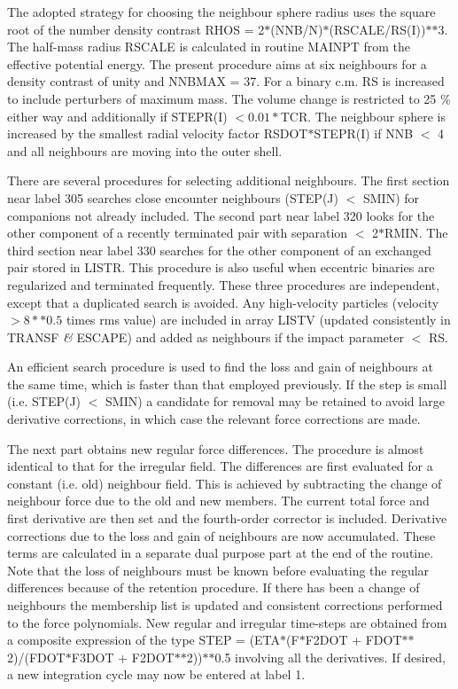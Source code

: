   The adopted strategy for choosing the neighbour sphere radius uses
 the square root of the number density contrast 
 RHOS = 2$\ast$(NNB/N)$\ast$(RSCALE/RS(I))$\ast$$\ast$3.  The half-mass radius 
 RSCALE is calculated in routine MAINPT from the effective potential
 energy.  The present procedure aims
 at six neighbours for a density contrast of unity and NNBMAX = 37.  For a
 binary c.m. RS is increased to include perturbers of 
 maximum mass.  The volume change is restricted to 25 \% either way and additionally
 if STEPR(I) $< 0.01\ast$TCR.  The neighbour
 sphere is increased by the smallest radial velocity factor
 RSDOT$\ast$STEPR(I) if NNB $<$ 4 and all neighbours are moving into the outer shell.

 There are several procedures for selecting additional neighbours.  The first
 section near label 305 searches close encounter neighbours (STEP(J) $<$ SMIN)
 for companions not already included.  The second part near label 320 looks for
 the other component of a recently terminated pair with separation $<$
 2$\ast$RMIN.  The third section near label 330 searches for the other
 component of an exchanged pair stored in LISTR.  This procedure is also
 useful when eccentric binaries are regularized and terminated
 frequently.  These three procedures are independent, except that 
 a duplicated search is
 avoided.  Any high-velocity particles (velocity $> 8\ast \ast 0.5$ times rms value) are   
 included in array LISTV (updated consistently in TRANSF {\it\&} ESCAPE)
 and added as neighbours if the impact parameter $<$ RS.

  An efficient search procedure is used to find the loss and gain of
 neighbours at the same time, which is faster than that employed
 previously.  If the step is small
 (i.e. STEP(J) $<$ SMIN) a candidate for removal may be retained to avoid large
 derivative corrections, in which case the relevant force corrections are made.

  The next part obtains new regular force differences.  The procedure is almost
 identical to that for the irregular field.  The
 differences are first evaluated for a constant (i.e. old) neighbour
 field.  This is
 achieved by subtracting the change of neighbour force due to the old
 and new members.  The current total force
 and first derivative are then set and the fourth-order corrector
 is included.  Derivative corrections due to the loss and gain of
 neighbours are now accumulated.  These terms are calculated in a
 separate dual purpose part at the end of the routine.  Note that the
 loss of neighbours must be known before evaluating the regular differences because
 of the retention procedure.  If there has been a change of neighbours the
 membership list is updated and consistent corrections performed to the force
 polynomials.  New regular and irregular time-steps are obtained 
 from a composite expression of the type STEP =
 (ETA$\ast$(F$\ast$F2DOT + FDOT$\ast$$\ast$2)/(FDOT$\ast$F3DOT +
 F2DOT$\ast$$\ast$2))$\ast$$\ast$0.5 involving all the derivatives.  
 If desired, a new integration cycle may now be entered at label 1.

